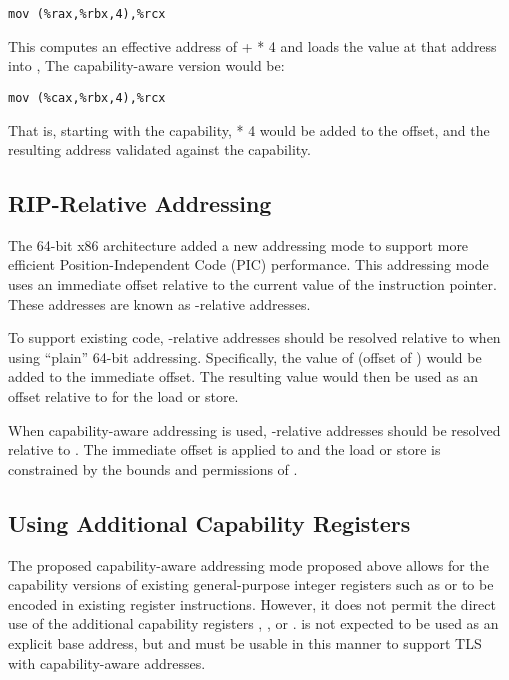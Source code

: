 \begin{verbatim}
mov (%rax,%rbx,4),%rcx
\end{verbatim}

This computes an effective address of \RAX{} + \RBX{} * 4 and loads the value
at that address into \RCX{},  The capability-aware version would be:

\begin{verbatim}
mov (%cax,%rbx,4),%rcx
\end{verbatim}

That is, starting with the \CAX{} capability, \RBX{} * 4 would be added to the
offset, and the resulting address validated against the \CAX{} capability.

\subsection{RIP-Relative Addressing}

The 64-bit x86 architecture added a new addressing mode to support more
efficient Position-Independent Code (PIC) performance.
This addressing mode uses an immediate offset
relative to the current value of the instruction
pointer.  These addresses are known as \RIP{}-relative addresses.

To support existing code, \RIP{}-relative addresses should be resolved
relative to \DDC{} when using ``plain'' 64-bit addressing.
Specifically, the value of \RIP{} (offset of \CIP{}) would be added to
the immediate offset.  The resulting value would then be used as an
offset relative to \DDC{} for the load or store.

When capability-aware addressing is used, \RIP{}-relative addresses
should be resolved relative to \CIP{}.
The immediate offset is applied to \CIP{} and the load
or store is constrained by the bounds and permissions of \CIP{}.

\subsection{Using Additional Capability Registers}

The proposed capability-aware addressing mode proposed above allows
for the capability versions of existing general-purpose integer registers such
as \CAX{} or \CBP{} to be encoded in existing register instructions.
However, it does not permit the direct use of the additional
capability registers \DDC{}, \CFS{}, or \CGS{}.  \DDC{} is not expected to be
used as an explicit base address, but \CFS{} and \CGS{} must be usable in this
manner to support TLS with capability-aware addresses.

